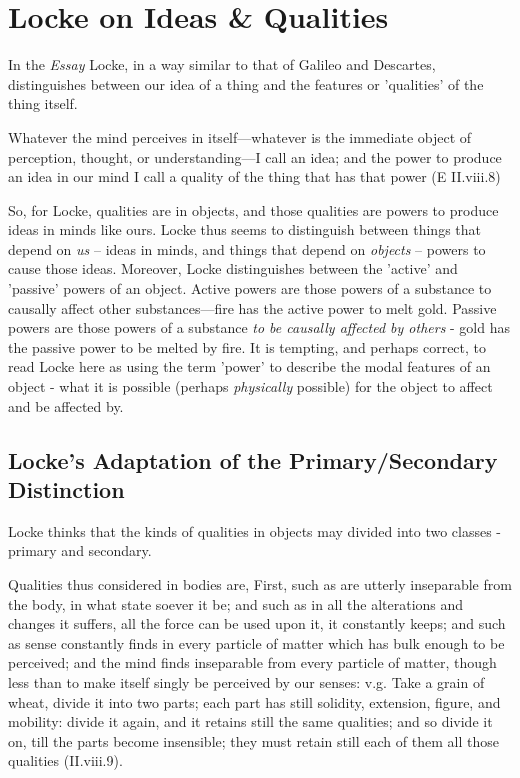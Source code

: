 \documentclass[12pt]{article}
\begin{document}
\section{Locke on Ideas \& Qualities}
\label{sec:org64b94b6}
In the \emph{Essay} Locke, in a way similar to that of Galileo and Descartes,
distinguishes between our idea of a thing and the features or
'qualities' of the thing itself.

\begin{quote-b}
Whatever the mind perceives in itself---whatever is the immediate
object of perception, thought, or understanding---I call an idea; and
the power to produce an idea in our mind I call a quality of the thing
that has that power (E II.viii.8)
\end{quote-b}

So, for Locke, qualities are in objects, and those qualities are powers
to produce ideas in minds like ours. Locke thus seems to distinguish
between things that depend on \emph{us} -- ideas in minds, and things that
depend on \emph{objects} -- powers to cause those ideas. Moreover, Locke
distinguishes between the 'active' and 'passive' powers of an object.
Active powers are those powers of a substance to causally affect other
substances---fire has the active power to melt gold. Passive powers are
those powers of a substance \emph{to be causally affected by others} - gold
has the passive power to be melted by fire. It is tempting, and perhaps
correct, to read Locke here as using the term 'power' to describe the
modal features of an object - what it is possible (perhaps \emph{physically}
possible) for the object to affect and be affected by.

\subsection{Locke's Adaptation of the Primary/Secondary Distinction}
\label{sec:org09080fb}
Locke thinks that the kinds of qualities in objects may divided into two
classes - primary and secondary.

\begin{quote-b}
Qualities thus considered in bodies are, First, such as are utterly
inseparable from the body, in what state soever it be; and such as in
all the alterations and changes it suffers, all the force can be used
upon it, it constantly keeps; and such as sense constantly finds in
every particle of matter which has bulk enough to be perceived; and
the mind finds inseparable from every particle of matter, though less
than to make itself singly be perceived by our senses: v.g. Take a
grain of wheat, divide it into two parts; each part has still
solidity, extension, figure, and mobility: divide it again, and it
retains still the same qualities; and so divide it on, till the parts
become insensible; they must retain still each of them all those
qualities (II.viii.9).
\end{quote-b}
\end{document}
